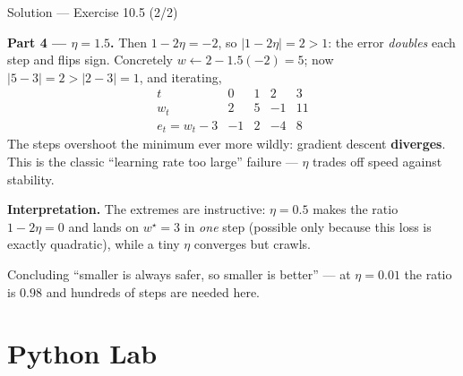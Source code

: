 \documentclass[aspectratio=169,11pt]{beamer}
\begin{document}
\begin{frame}{Solution --- Exercise 10.5 (2/2)}
\begin{solutionbox}
  \textbf{Part 4 --- $\eta = 1.5$.} Then $1 - 2\eta = -2$, so
  $|1 - 2\eta| = 2 > 1$: the error \emph{doubles} each step and flips
  sign. Concretely $w \leftarrow 2 - 1.5(-2) = 5$; now
  $|5 - 3| = 2 > |2 - 3| = 1$, and iterating,
  \[
    \begin{array}{c|cccc}
      t & 0 & 1 & 2 & 3 \\ \hline
      w_t & 2 & 5 & -1 & 11 \\
      e_t = w_t - 3 & -1 & 2 & -4 & 8
    \end{array}
  \]
  The steps overshoot the minimum ever more wildly: gradient
  descent \textbf{diverges}. This is the classic ``learning rate too
  large'' failure --- $\eta$ trades off speed against stability.

  \medskip
  \textbf{Interpretation.} The extremes are instructive: $\eta = 0.5$ makes
  the ratio $1 - 2\eta = 0$ and lands on $w^\star = 3$ in \emph{one} step
  (possible only because this loss is exactly quadratic), while a tiny
  $\eta$ converges but crawls.

\end{solutionbox}
\begin{mistake}
  Concluding ``smaller is always safer, so smaller is better'' --- at
  $\eta = 0.01$ the ratio is $0.98$ and hundreds of steps are needed here.
\end{mistake}
\end{frame}

\section{Python Lab}
\end{document}
